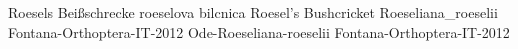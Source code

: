 {Roesels Bei{\ss}schrecke} %
{roeselova bilcnica} %
{Roesel's Bushcricket} %
{Roeseliana_roeselii} %
{Fontana-Orthoptera-IT-2012}%
{} %
{\url{}} %
{} %
{} %
{Ode-Roeseliana-roeselii} %
{Fontana-Orthoptera-IT-2012}%
